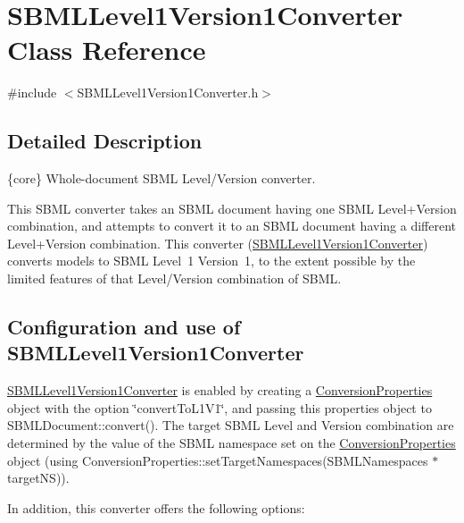\hypertarget{class_s_b_m_l_level1_version1_converter}{}\section{S\+B\+M\+L\+Level1\+Version1\+Converter Class Reference}
\label{class_s_b_m_l_level1_version1_converter}


{\ttfamily \#include $<$S\+B\+M\+L\+Level1\+Version1\+Converter.\+h$>$}



\subsection{Detailed Description}
\{core\} Whole-\/document S\+B\+ML Level/\+Version converter.



This S\+B\+ML converter takes an S\+B\+ML document having one S\+B\+ML Level+\+Version combination, and attempts to convert it to an S\+B\+ML document having a different Level+\+Version combination. This converter (\hyperlink{class_s_b_m_l_level1_version1_converter}{S\+B\+M\+L\+Level1\+Version1\+Converter}) converts models to S\+B\+ML Level~1 Version~1, to the extent possible by the limited features of that Level/\+Version combination of S\+B\+ML.\hypertarget{class_s_b_m_l_level1_version1_converter_SBMLLevel1Version1Converter-usage}{}\subsection{Configuration and use of S\+B\+M\+L\+Level1\+Version1\+Converter}\label{class_s_b_m_l_level1_version1_converter_SBMLLevel1Version1Converter-usage}
\hyperlink{class_s_b_m_l_level1_version1_converter}{S\+B\+M\+L\+Level1\+Version1\+Converter} is enabled by creating a \hyperlink{class_conversion_properties}{Conversion\+Properties} object with the option {\ttfamily \char`\"{}convert\+To\+L1\+V1\char`\"{}}, and passing this properties object to S\+B\+M\+L\+Document\+::convert(). The target S\+B\+ML Level and Version combination are determined by the value of the S\+B\+ML namespace set on the \hyperlink{class_conversion_properties}{Conversion\+Properties} object (using Conversion\+Properties\+::set\+Target\+Namespaces(\+S\+B\+M\+L\+Namespaces $\ast$target\+N\+S)).

In addition, this converter offers the following options\+:

